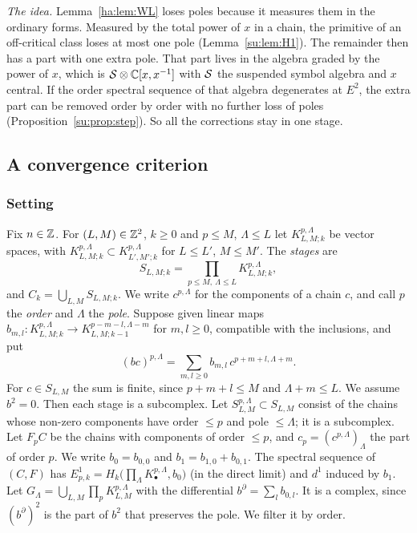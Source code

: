 \emph{The idea.} Lemma~\ref{ha:lem:WL} loses poles because it measures
them in the ordinary forms. Measured by the total power of \(x\) in a
chain, the primitive of an off-critical class loses at most one pole
(Lemma~\ref{su:lem:H1}). The remainder then has a part with one extra
pole. That part lives in the algebra graded by the power of \(x\), which
is \(\mathcal S\otimes\mathbb C[x,x^{-1}]\) with \(\mathcal S\) the suspended symbol algebra
and \(x\) central. If the order spectral sequence of that algebra
degenerates at \(E^2\), the extra part can be removed order by order with
no further loss of poles (Proposition~\ref{su:prop:step}). So all the
corrections stay in one stage.

\subsection{A convergence criterion}\label{su:subsec:criterion}

\subsubsection*{Setting}
Fix \(n\in\mathbb Z\). For \((L,M)\in\mathbb Z^2\), \(k\ge0\) and \(p\le M\),
\(\Lambda\le L\) let \(K^{p,\Lambda}_{L,M;k}\) be vector spaces, with
\(K^{p,\Lambda}_{L,M;k}\subset K^{p,\Lambda}_{L',M';k}\) for \(L\le L'\),
\(M\le M'\). The \emph{stages} are
\[
 S_{L,M;k}=\prod_{p\le M,\ \Lambda\le L}K^{p,\Lambda}_{L,M;k},
\]
and \(C_k=\bigcup_{L,M}S_{L,M;k}\). We write \(c^{p,\Lambda}\) for the
components of a chain \(c\), and call \(p\) the \emph{order} and
\(\Lambda\) the \emph{pole}. Suppose given linear maps
\(b_{m,l}:K^{p,\Lambda}_{L,M;k}\to K^{p-m-l,\Lambda-m}_{L,M;k-1}\) for
\(m,l\ge0\), compatible with the inclusions, and put
\[
 (bc)^{p,\Lambda}=\sum_{m,l\ge0}b_{m,l}\,c^{p+m+l,\Lambda+m}.
\]
For \(c\in S_{L,M}\) the sum is finite, since \(p+m+l\le M\) and
\(\Lambda+m\le L\). We assume \(b^2=0\). Then each stage is a subcomplex.
Let \(S^{p,\Lambda}_{L,M}\subset S_{L,M}\) consist of the chains whose
non-zero components have order \(\le p\) and pole \(\le\Lambda\); it is a
subcomplex. Let \(F_pC\) be the chains with components of order \(\le
p\), and \(c_p=(c^{p,\Lambda})_\Lambda\) the part of order \(p\). We write
\(b_0=b_{0,0}\) and \(b_1=b_{1,0}+b_{0,1}\). The spectral sequence of
\((C,F)\) has \(E^1_{p,k}=H_k\bigl(\prod_\Lambda K^{p,\Lambda}_{\bullet},
b_0\bigr)\) (in the direct limit) and \(d^1\) induced by \(b_1\). Let
\(G_\Lambda=\bigcup_{L,M}\prod_pK^{p,\Lambda}_{L,M}\) with the
differential \(b^\partial=\sum_lb_{0,l}\). It is a complex, since
\((b^\partial)^2\) is the part of \(b^2\) that preserves the pole. We
filter it by order.

